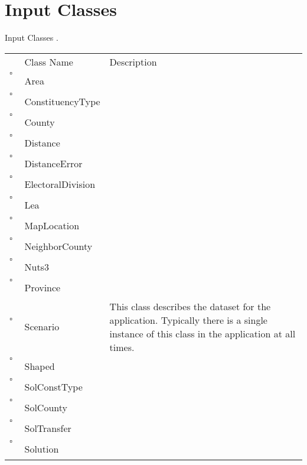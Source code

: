 \chapter{Input Classes}
Input Classes     .
\begin{longtable}{llp{8cm}}
& Class Name & Description \\
$\square$\ & Area &  \\
$\square$\ & ConstituencyType &  \\
$\square$\ & County &  \\
$\square$\ & Distance &  \\
$\square$\ & DistanceError &  \\
$\square$\ & ElectoralDivision &  \\
$\square$\ & Lea &  \\
$\square$\ & MapLocation &  \\
$\square$\ & NeighborCounty &  \\
$\square$\ & Nuts3 &  \\
$\square$\ & Province &  \\
$\square$\ & Scenario & This class describes the dataset for the application. Typically there is a single instance of this class in the application at all times. \\
$\square$\ & Shaped &  \\
$\square$\ & SolConstType &  \\
$\square$\ & SolCounty &  \\
$\square$\ & SolTransfer &  \\
$\square$\ & Solution &  \\
\end{longtable}
